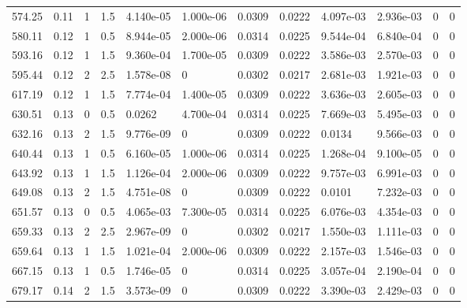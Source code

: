 \documentclass[preview]{standalone}
\begin{document}
{{{\begin{tabular}{L{1.2cm}C{1.2cm} C{0.3cm}C{0.5cm} C{1.4cm}C{1.4cm} C{1.4cm}C{1.4cm} C{1.6cm}C{1.6cm} C{1.6cm}C{1.6cm}}
  574.25  &  0.11  & 1     & 1.5 &  4.140e-05  & 1.000e-06  &  0.0309&   0.0222& 4.097e-03 & 2.936e-03   &  0 & 0  \\ 
  580.11  &  0.12  & 1     & 0.5 &  8.944e-05  & 2.000e-06  &  0.0314&   0.0225& 9.544e-04 & 6.840e-04   &  0 & 0  \\ 
  593.16  &  0.12  & 1     & 1.5 &  9.360e-04  & 1.700e-05  &  0.0309&   0.0222& 3.586e-03 & 2.570e-03   &  0 & 0  \\ 
  595.44  &  0.12  & 2     & 2.5 &  1.578e-08  & 0  &  0.0302&   0.0217& 2.681e-03 & 1.921e-03   &  0 & 0  \\ 
  617.19  &  0.12  & 1     & 1.5 &  7.774e-04  & 1.400e-05  &  0.0309&   0.0222& 3.636e-03 & 2.605e-03   &  0 & 0  \\ 
  630.51  &  0.13  & 0     & 0.5 &  0.0262  & 4.700e-04  &  0.0314&   0.0225& 7.669e-03 & 5.495e-03   &  0 & 0  \\ 
  632.16  &  0.13  & 2     & 1.5 &  9.776e-09  & 0  &  0.0309&   0.0222& 0.0134 & 9.566e-03   &  0 & 0  \\ 
  640.44  &  0.13  & 1     & 0.5 &  6.160e-05  & 1.000e-06  &  0.0314&   0.0225& 1.268e-04 & 9.100e-05   &  0 & 0  \\ 
  643.92  &  0.13  & 1     & 1.5 &  1.126e-04  & 2.000e-06  &  0.0309&   0.0222& 9.757e-03 & 6.991e-03   &  0 & 0  \\ 
  649.08  &  0.13  & 2     & 1.5 &  4.751e-08  & 0  &  0.0309&   0.0222& 0.0101 & 7.232e-03   &  0 & 0  \\ 
  651.57  &  0.13  & 0     & 0.5 &  4.065e-03  & 7.300e-05  &  0.0314&   0.0225& 6.076e-03 & 4.354e-03   &  0 & 0  \\ 
  659.33  &  0.13  & 2     & 2.5 &  2.967e-09  & 0  &  0.0302&   0.0217& 1.550e-03 & 1.111e-03   &  0 & 0  \\ 
  659.64  &  0.13  & 1     & 1.5 &  1.021e-04  & 2.000e-06  &  0.0309&   0.0222& 2.157e-03 & 1.546e-03   &  0 & 0  \\ 
  667.15  &  0.13  & 1     & 0.5 &  1.746e-05  & 0  &  0.0314&   0.0225& 3.057e-04 & 2.190e-04   &  0 & 0  \\ 
  679.17  &  0.14  & 2     & 1.5 &  3.573e-09  & 0  &  0.0309&   0.0222& 3.390e-03 & 2.429e-03   &  0 & 0  \\ 
\hline 
\end{tabular} 

}}}
\end{document}
